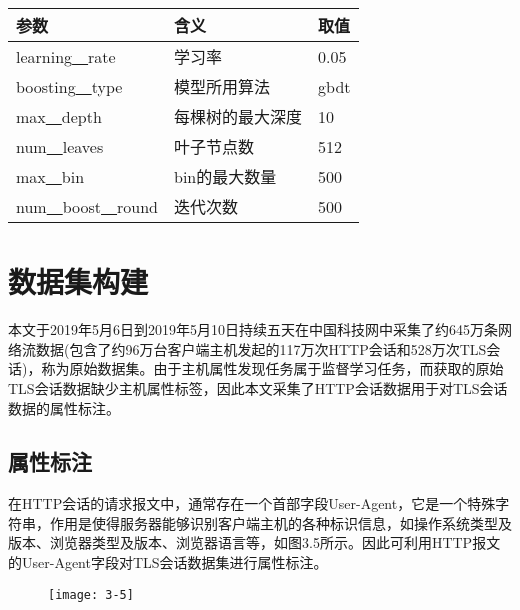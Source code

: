 \begin{table}[!htbp] 
    \centering
    \footnotesize
    \setlength{\tabcolsep}{20pt}
    \renewcommand{\arraystretch}{1}
\begin{tabular}{lll}
\toprule
参数 & 含义 & 取值 \\ \hline
learning\underline{~~}rate & 学习率 & 0.05 \\ 
boosting\underline{~~}type & 模型所用算法 & gbdt \\ 
max\underline{~~}depth & 每棵树的最大深度 & 10 \\ 
num\underline{~~}leaves & 叶子节点数 & 512 \\ 
max\underline{~~}bin & bin的最大数量 & 500 \\ 
num\underline{~~}boost\underline{~~}round & 迭代次数 & 500 \\ 
\bottomrule
\end{tabular}
\end{table}

\section{数据集构建}

本文于2019年5月6日到2019年5月10日持续五天在中国科技网中采集了约645万条网络流数据(包含了约96万台客户端主机发起的117万次HTTP会话和528万次TLS会话)，称为原始数据集。由于主机属性发现任务属于监督学习任务，而获取的原始TLS会话数据缺少主机属性标签，因此本文采集了HTTP会话数据用于对TLS会话数据的属性标注。

\subsection{属性标注} 

在HTTP会话的请求报文中，通常存在一个首部字段User-Agent，它是一个特殊字符串，作用是使得服务器能够识别客户端主机的各种标识信息，如操作系统类型及版本、浏览器类型及版本、浏览器语言等，如图3.5所示。因此可利用HTTP报文的User-Agent字段对TLS会话数据集进行属性标注。

\begin{figure}[!h]
    \centering
    \texttt{[image: 3-5]}
\end{figure}

